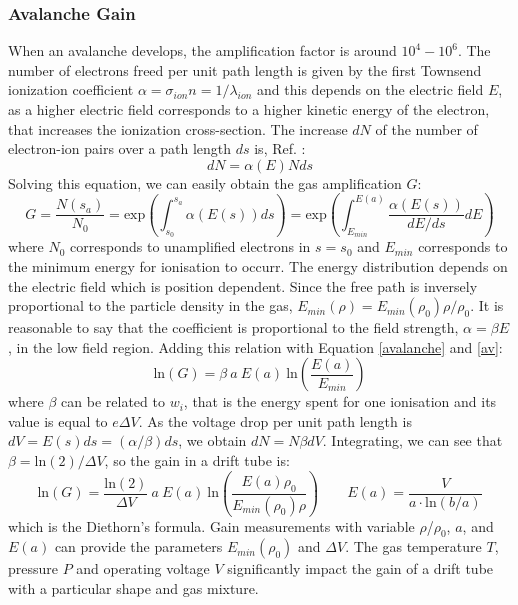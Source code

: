 \subsubsection{Avalanche Gain}
When an avalanche develops, the amplification factor is around $10^4-10^6$. The number of electrons freed per unit path length is given
by the first Townsend ionization coefficient $\alpha=\sigma_{ion}n=1/\lambda_{ion}$ and this depends on the electric field $E$, 
as a higher electric field corresponds to a higher kinetic energy of the electron, that increases the ionization cross-section.
The increase $dN$ of the number of electron-ion pairs over a path length $ds$ is, Ref. \cite{kola}:
\begin{equation}
    dN=\alpha(E)Nds
\end{equation}
Solving this equation, we can easily obtain the gas amplification $G$:
\begin{equation}\label{av}
    G=\frac{N(s_a)}{N_0}=\text{exp} \left( \int_{s_0}^{s_a} \alpha(E(s)) ds \right)=\text{exp} \left( \int_{E_{min}}^{E(a)} \frac{\alpha(E(s))}{dE/ds} dE \right)
\end{equation}
where $N_0$ corresponds to unamplified electrons in $s=s_0$ and $E_{min}$ corresponds to the minimum energy 
for ionisation to occurr. The energy distribution depends on the electric field which is position dependent. 
Since the free path is inversely proportional to the particle density in the gas, $E_{min}(\rho)=E_{min}(\rho_0)\rho/\rho_0$.
It is reasonable to say that the coefficient is proportional to the field strength, $\alpha= \beta E$, in the low field region. 
Adding this relation with Equation \ref{avalanche} and \ref{av}:
\begin{equation}
     \text{ln}(G)=\beta \ a \ E(a) \ \text{ln}\left( \frac{E(a)}{E_{min}}\right)
\end{equation}
where $\beta$ can be related to $w_i$, that is the energy spent for one ionisation and its value is equal to $e \Delta V$.
As the voltage drop per unit path length is $dV = E(s)ds = (\alpha/\beta)ds$, we obtain $dN=N \beta dV$. Integrating, we can see that
$\beta= \text{ln}(2)/\Delta V$, so the gain in a drift tube is:
\begin{equation}\label{XXX}
     \text{ln}(G)=\frac{ \text{ln}(2)}{\Delta V} \ a \ E(a)  \ \text{ln}\left( \frac{E(a)\rho_0}{E_{min}(\rho_0)\rho}\right) \qquad E(a)=\frac{V}{a \cdot \text{ln}(b/a)}
\end{equation}
which is the Diethorn's formula. 
Gain measurements with variable $\rho$/$\rho_0$, $a$, and $E(a)$ can provide the parameters $E_{min} (\rho_0)$ and $\Delta V$. 
The gas temperature $T$, pressure $P$ and operating voltage $V$ significantly impact the gain of a drift tube with a particular shape and gas mixture. 
